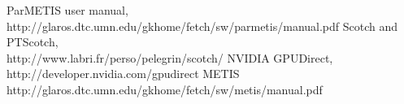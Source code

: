 \documentclass[11pt]{article}
\begin{document}
\begin{thebibliography}{4}
 ParMETIS user manual,\\http://glaros.dtc.umn.edu/gkhome/fetch/sw/parmetis/manual.pdf
 Scotch and PTScotch,\\http://www.labri.fr/perso/pelegrin/scotch/
 NVIDIA GPUDirect, \\http://developer.nvidia.com/gpudirect
 METIS \\http://glaros.dtc.umn.edu/gkhome/fetch/sw/metis/manual.pdf
 \end{thebibliography}
\end{document}
